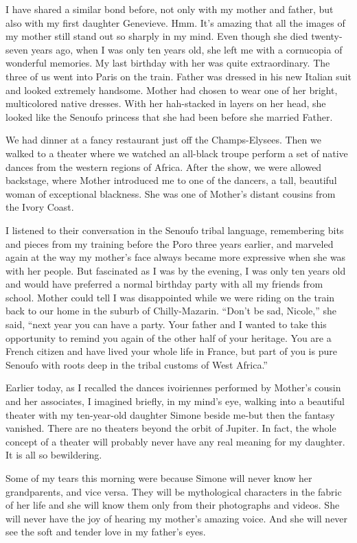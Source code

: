 \documentclass[]{article}
\begin{document}
I have shared a similar bond before, not only with my mother and father, but also with my first daughter Genevieve.  Hmm.  It’s amazing that all the images of my mother still stand out so sharply in my mind.  Even though she died twenty-seven years ago, when I was only ten years old, she left me with a cornucopia of wonderful memories.  My last birthday with her was quite extraordinary.  The three of us went into Paris on the train.  Father was dressed in his new Italian suit and looked extremely handsome.  Mother had chosen to wear one of her bright, multicolored native dresses.  With her hah-stacked in layers on her head, she looked like the Senoufo princess that she had been before she married Father.

We had dinner at a fancy restaurant just off the Champs-Elysees.  Then we walked to a theater where we watched an all-black troupe perform a set of native dances from the western regions of Africa.  After the show, we were allowed backstage, where Mother introduced me to one of the dancers, a tall, beautiful woman of exceptional blackness.  She was one of Mother’s distant cousins from the Ivory Coast.

I listened to their conversation in the Senoufo tribal language, remembering bits and pieces from my training before the Poro three years earlier, and marveled again at the way my mother’s face always became more expressive when she was with her people.  But fascinated as I was by the evening, I was only ten years old and would have preferred a normal birthday party with all my friends from school.  Mother could tell I was disappointed while we were riding on the train back to our home in the suburb of Chilly-Mazarin.  “Don’t be sad, Nicole,” she said, “next year you can have a party.  Your father and I wanted to take this opportunity to remind you again of the other half of your heritage.  You are a French citizen and have lived your whole life in France, but part of you is pure Senoufo with roots deep in the tribal customs of West Africa.”

Earlier today, as I recalled the dances ivoiriennes performed by Mother’s cousin and her associates, I imagined briefly, in my mind’s eye, walking into a beautiful theater with my ten-year-old daughter Simone beside me-but then the fantasy vanished.  There are no theaters beyond the orbit of Jupiter.  In fact, the whole concept of a theater will probably never have any real meaning for my daughter.  It is all so bewildering.

Some of my tears this morning were because Simone will never know her grandparents, and vice versa.  They will be mythological characters in the fabric of her life and she will know them only from their photographs and videos.  She will never have the joy of hearing my mother’s amazing voice.  And she will never see the soft and tender love in my father’s eyes.
\end{document}
